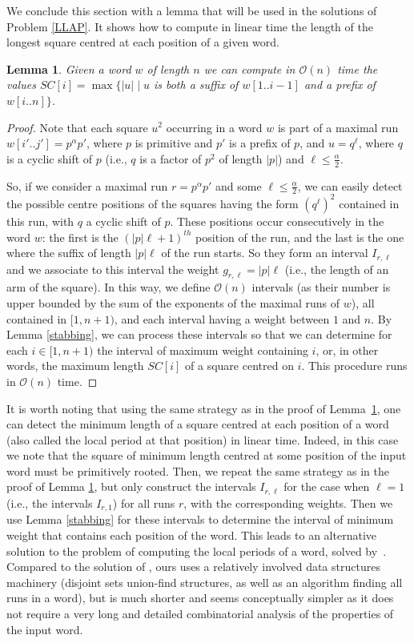 \documentclass[final]{dmtcs-episciences}
\newcommand{\bigo}{{\mathcal O}}
\newtheorem{lemma}{Lemma}
\begin{document}
We conclude this section with a lemma that will be used in the solutions of Problem \ref{LLAP}. It shows how to compute in linear time the length of the longest square centred at each position of a given word. 
\begin{lemma}\label{centred_squares}
Given a word $w$ of length $n$ we can compute in $\bigo(n)$ time the values $SC[i]=\max\{|u|\mid u$ is both a suffix of $w[1..i-1]$ and a prefix of $w[i..n]\}$.
\end{lemma}
\begin{proof}
Note that each square $u^2$ occurring in a word $w$ is part of a maximal run $w[i'..j']=p^\alpha p'$, where $p$ is primitive and $p'$ is a prefix of $p$, and $u=q^\ell$, where $q$ is a cyclic shift of $p$ (i.e., $q$ is a factor of $p^2$ of length $|p|$) and $\ell \leq \frac{\alpha}{2}$. 

So, if we consider a maximal run $r=p^\alpha p'$ and some $\ell\leq \frac{\alpha}{2}$, we can easily detect the possible centre positions of the squares having the form $(q^\ell)^2$ contained in this run, with $q$ a cyclic shift of $p$. These positions occur consecutively in the word $w$: the first is the $(|p|\ell+1)^{th}$ position of the run, and the last is the one where the suffix of length $|p|{\ell}$ of the run starts. So they form an interval $I_{r,\ell}$ and we associate to this interval the weight $g_{r,\ell}=|p|\ell$ (i.e., the length of an arm of the square). In this way, we define $\bigo(n)$ intervals (as their number is upper bounded by the sum of the exponents of the maximal runs of $w$), all contained in $[1,n+1)$, and each interval having a weight between $1$ and $n$. By Lemma \ref{stabbing}, we can process these intervals so that we can determine for each $i\in [1,n+1)$ the interval of maximum weight containing $i$, or, in other words, the maximum length $SC[i]$ of a square centred on $i$. This procedure runs in $\bigo(n)$ time. 
 \end{proof}

It is worth noting that using the same strategy as in the proof of Lemma~\ref{centred_squares}, one can detect the minimum length of a square centred at each position of a word (also called the local period at that position) in linear time. Indeed, in this case we note that the square of minimum length centred at some position of the input word must be primitively rooted. Then, we repeat the same strategy as in the proof of Lemma \ref{centred_squares}, but only construct the intervals $I_{r,\ell}$ for the case when $\ell=1$ (i.e., the intervals $I_{r,1}$) for all runs $r$, with the corresponding weights. Then we use Lemma \ref{stabbing} for these intervals to determine the interval of minimum weight that contains each position of the word.
This leads to an alternative solution to the problem of computing the local periods of a word, solved by~\cite{MFCS_Lecroq}. Compared to the solution of \cite{MFCS_Lecroq}, ours uses a relatively involved data structures machinery (disjoint sets union-find structures, as well as an algorithm finding all runs in a word), but is much shorter and seems conceptually simpler as it does not require a very long and detailed combinatorial analysis of the properties of the input word. 
\end{document}
